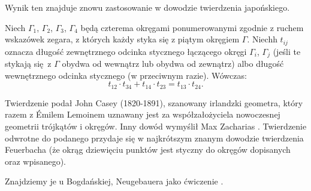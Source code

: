 Wynik ten znajduje znowu zastosowanie w dowodzie twierdzenia japońskiego. %

\begin{theorem}[Caseya, 1866]
%
    Niech $\Gamma_1$, $\Gamma_2$, $\Gamma_3$, $\Gamma_4$ będą czterema okręgami ponumerowanymi zgodnie z ruchem wskazówek zegara, z których każdy styka się z piątym okręgiem $\Gamma$.
    Niechh $t_{ij}$ oznacza długość zewnętrznego odcinka stycznego łączącego okręgi $\Gamma_i$, $\Gamma_j$ (jeśli te stykają się z $\Gamma$ obydwa od wewnątrz lub obydwa od zewnątrz) albo długość wewnętrznego odcinka stycznego (w przeciwnym razie).
    Wówczas:
    \begin{equation}
        t_{12} \cdot t_{34} + t_{14} \cdot t_{23} = t_{13} \cdot t_{24}.
    \end{equation}
\end{theorem}

Twierdzenie podał John Casey (1820-1891), szanowany irlandzki geometra, który razem z Émilem Lemoinem uznawany jest za współzałożyciela nowoczesnej geometrii trójkątów i okręgów.
%
Inny dowód wymyślił Max Zacharias \cite{zacharias_1942}.
Twierdzenie odwrotne do podanego przydaje się w najkrótszym znanym dowodzie twierdzenia Feuerbacha (że okrąg dziewięciu punktów jest styczny do okręgów dopisanych oraz wpisanego).

Znajdziemy je u Bogdańskiej, Neugebauera jako ćwiczenie \cite[s. 105]{neugebauer_2018}.

%
